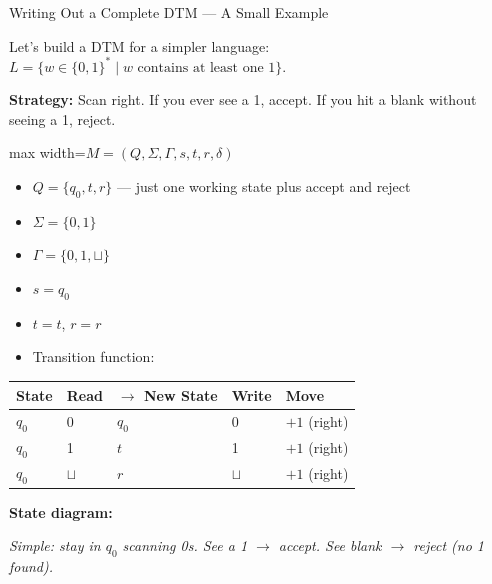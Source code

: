 \documentclass[11pt,a4paper]{article}
\newcommand{\fitmath}[1]{\begin{adjustbox}{max width=\linewidth}$\displaystyle #1$\end{adjustbox}}
\begin{document}
\begin{examplebox}{Writing Out a Complete DTM --- A Small Example}

Let's build a DTM for a simpler language: $L = \{w \in \{0,1\}^* \mid w \text{ contains at least one } 1\}$.

\textbf{Strategy:} Scan right. If you ever see a 1, accept. If you hit a blank without seeing a 1, reject.

\fitmath{M = (Q, \Sigma, \Gamma, s, t, r, \delta)}
\begin{itemize}[nosep]
\item $Q = \{q_0, t, r\}$ --- just one working state plus accept and reject
\item $\Sigma = \{0, 1\}$
\item $\Gamma = \{0, 1, \sqcup\}$
\item $s = q_0$
\item $t = t$, $r = r$
\item Transition function:
\end{itemize}

\begin{center}
\begin{tabular}{lllll}
\toprule
State & Read & $\to$ New State & Write & Move \\
\midrule
$q_0$ & 0 & $q_0$ & 0 & $+1$ (right) \\
$q_0$ & 1 & $t$ & 1 & $+1$ (right) \\
$q_0$ & $\sqcup$ & $r$ & $\sqcup$ & $+1$ (right) \\
\bottomrule
\end{tabular}
\end{center}

\textbf{State diagram:}
\begin{center}
\end{center}

\textit{Simple: stay in $q_0$ scanning 0s. See a 1 $\to$ accept. See blank $\to$ reject (no 1 found).}


\end{examplebox}
\end{document}
